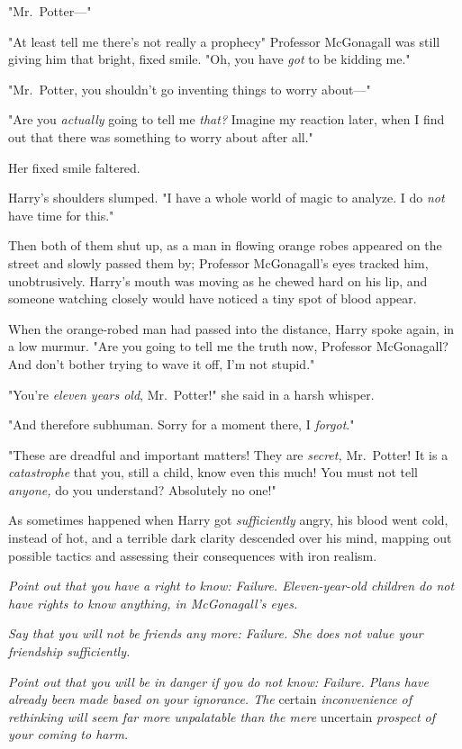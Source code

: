 "Mr.~Potter—"

"At least tell me there's not really a prophecy{\el}" Professor McGonagall
was still giving him that bright, fixed smile. "Oh, you have \emph{got} to be
kidding me."

"Mr.~Potter, you shouldn't go inventing things to worry about—"

"Are you \emph{actually} going to tell me \emph{that?} Imagine my reaction
later, when I find out that there was something to worry about after all."

Her fixed smile faltered.

Harry's shoulders slumped. "I have a whole world of magic to analyze. I do
\emph{not} have time for this."

Then both of them shut up, as a man in flowing orange robes appeared on the
street and slowly passed them by; Professor McGonagall's eyes tracked him,
unobtrusively. Harry's mouth was moving as he chewed hard on his lip, and
someone watching closely would have noticed a tiny spot of blood appear.

When the orange-robed man had passed into the distance, Harry spoke again, in a
low murmur. "Are you going to tell me the truth now, Professor McGonagall? And
don't bother trying to wave it off, I'm not stupid."

"You're \emph{eleven years old}, Mr.~Potter!" she said in a harsh whisper.

"And therefore subhuman. Sorry{\el} for a moment there, I \emph{forgot}."

"These are dreadful and important matters! They are \emph{secret,} Mr.~Potter!
It is a \emph{catastrophe} that you, still a child, know even this much! You
must not tell \emph{anyone,} do you understand? Absolutely no one!"

As sometimes happened when Harry got \emph{sufficiently} angry, his blood went
cold, instead of hot, and a terrible dark clarity descended over his mind,
mapping out possible tactics and assessing their consequences with iron realism.

\emph{Point out that you have a right to know: Failure. Eleven-year-old
children do not have rights to know anything, in McGonagall's eyes.}

\emph{Say that you will not be friends any more: Failure. She does not value
your friendship sufficiently.}

\emph{Point out that you will be in danger if you do not know: Failure. Plans
have already been made based on your ignorance. The} certain
\emph{inconvenience of rethinking will seem far more unpalatable than the mere}
uncertain \emph{prospect of your coming to harm.}

